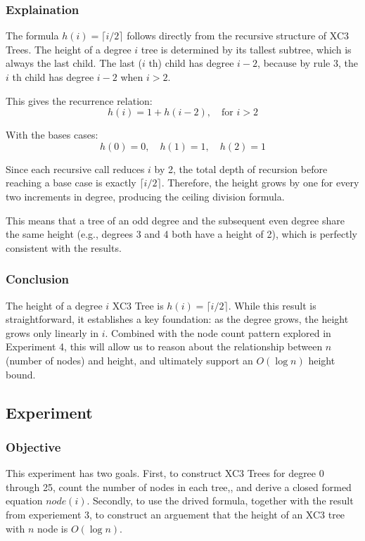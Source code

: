 \documentclass[letterpaper]{article}
\theoremstyle{plain}
\theoremstyle{definition}
\theoremstyle{remark}
\newcounter{experiment}
\begin{document}
\subsubsection*{Explaination}
The formula $h(i) = \lceil i/2 \rceil$ follows directly from the recursive structure of XC3 Trees. The height of a
degree $i$ tree is determined by its tallest subtree, which is always the last child. The last ($i$ th) child has degree
$i - 2$, because by rule 3, the $i$ th child has degree $i - 2$ when $i > 2$.

This gives the recurrence relation: 
$$h(i) = 1 + h(i - 2), \quad \text{for } i > 2$$

With the bases cases:
$$h(0) = 0, \quad h(1) = 1, \quad h(2) = 1$$

Since each recursive call reduces $i$ by 2, the total depth of recursion before reaching a base case is exactly $\lceil i/2 \rceil$.
Therefore, the height grows by one for every two increments in degree, producing the ceiling division formula. 

This means that a tree of an odd degree and the subsequent even degree share the same height (e.g., degrees 3 and 4 both have a height of 2),
which is perfectly consistent with the results.

\subsubsection*{Conclusion}
The height of a degree $i$ XC3 Tree is $h(i) = \lceil i/2 \rceil$. While this result is straightforward, it establishes a key foundation:
as the degree grows, the height grows only linearly in $i$. Combined with the node count pattern explored in Experiment 4, this will 
allow us to reason about the relationship between $n$ (number of nodes) and height, and ultimately support an $O(\log n)$ height bound.

\subsection*{Experiment \theexperiment}
\label{exp4}
\subsubsection*{Objective}
This experiment has two goals. First, to construct XC3 Trees for degree 0 through 25, count the number of nodes in each tree,,
and derive a closed formed equation $node(i)$. Secondly, to use the drived formula, together with the result from experiement 3, 
to construct an arguement that the height of an XC3 tree with $n$ node is $O(\log n )$.
\end{document}
